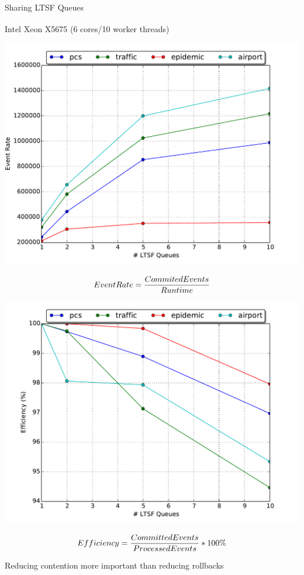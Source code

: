 \documentclass[10pt]{beamer}
\begin{document}
\begin{frame}{Sharing LTSF Queues}
  \bigskip
  \bigskip
    \begin{block}{Intel\textsuperscript{\textregistered} Xeon\textsuperscript{\textregistered} X5675 (6 cores/10 worker threads)}\end{block}
    \vspace*{-\medskipamount}
    \begin{minipage}{0.55\textwidth}
        \centerline{\includegraphics[width=\textwidth]{../figs/pending_event_set/ltsf_event_rate.pdf}}
        \vspace*{-\medskipamount}
        \small{$$EventRate={CommitedEvents \over Runtime}$$}
    \end{minipage}%
    \begin{minipage}{0.55\textwidth}
        \centerline{\includegraphics[width=\textwidth]{../figs/pending_event_set/ltsf_efficiency.pdf}}
        \vspace*{-\bigskipamount}
        \small{$$Efficiency={CommittedEvents \over ProcessedEvents}*100 \%$$}
    \end{minipage}
    \medskip
    \begin{block}{Reducing contention more important than reducing rollbacks}\end{block}
\end{frame}
\end{document}
